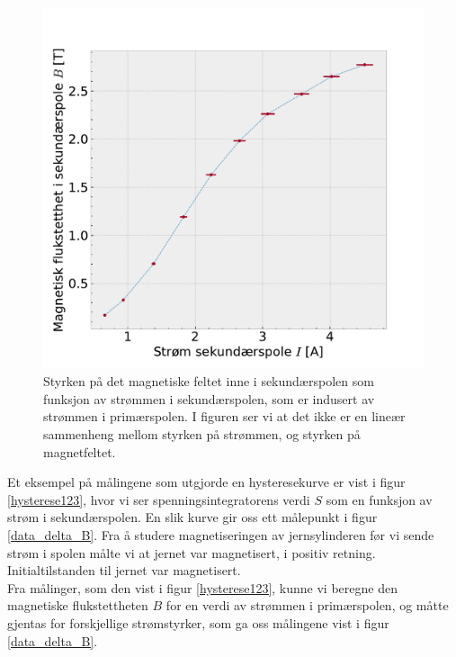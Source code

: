 \documentclass[%
 reprint,
 amsmath,amssymb,
 aps,
 norsk,
]{revtex4-1}
\begin{document}
\begin{figure}[h!]
  \centering
  \includegraphics[scale=0.45]{magnetic_secondary_hysterese.pdf}
  \caption{Styrken på det magnetiske feltet inne i sekundærspolen som funksjon av strømmen i sekundærspolen, som er indusert av strømmen i primærspolen. I figuren ser vi at det ikke er en lineær sammenheng mellom styrken på strømmen, og styrken på magnetfeltet.}
  \label{data_delta_B}
\end{figure}
Et eksempel på målingene som utgjorde en hysteresekurve er vist i figur \vref{hysterese123}, hvor vi ser spenningsintegratorens verdi $S$ som en funksjon av strøm i sekundærspolen. En slik kurve gir oss ett målepunkt i figur \vref{data_delta_B}. Fra å studere magnetiseringen av jernsylinderen før vi sende strøm i spolen målte vi at jernet var magnetisert, i positiv retning. Initialtilstanden til jernet var magnetisert. \\ Fra målinger, som den vist i figur \vref{hysterese123}, kunne vi beregne den magnetiske flukstettheten $B$ for en verdi av strømmen i primærspolen, og måtte gjentas for forskjellige strømstyrker, som ga oss målingene vist i figur \vref{data_delta_B}.
\end{document}
